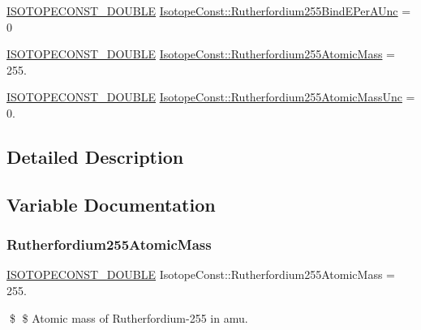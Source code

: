 \begin{DoxyCompactItemize}
\item 
\mbox{\hyperlink{group___isotope_const-_macros_ga8f45a7272ce02c0b4c65c44636ed719a}{I\+S\+O\+T\+O\+P\+E\+C\+O\+N\+S\+T\+\_\+\+D\+O\+U\+B\+LE}} \mbox{\hyperlink{group___isotope_const-_rutherfordium-_rf255_ga0dbb389acb0612f0ec6556b00e3f41ba}{Isotope\+Const\+::\+Rutherfordium255\+Bind\+E\+Per\+A\+Unc}} = 0
\item 
\mbox{\hyperlink{group___isotope_const-_macros_ga8f45a7272ce02c0b4c65c44636ed719a}{I\+S\+O\+T\+O\+P\+E\+C\+O\+N\+S\+T\+\_\+\+D\+O\+U\+B\+LE}} \mbox{\hyperlink{group___isotope_const-_rutherfordium-_rf255_ga402c320ed18f5c81a62d2c03af5edc82}{Isotope\+Const\+::\+Rutherfordium255\+Atomic\+Mass}} = 255.
\item 
\mbox{\hyperlink{group___isotope_const-_macros_ga8f45a7272ce02c0b4c65c44636ed719a}{I\+S\+O\+T\+O\+P\+E\+C\+O\+N\+S\+T\+\_\+\+D\+O\+U\+B\+LE}} \mbox{\hyperlink{group___isotope_const-_rutherfordium-_rf255_ga186204b6cec0d246875af6b3f2b8af80}{Isotope\+Const\+::\+Rutherfordium255\+Atomic\+Mass\+Unc}} = 0.
\end{DoxyCompactItemize}


\subsection{Detailed Description}


\subsection{Variable Documentation}
\mbox{\label{group___isotope_const-_rutherfordium-_rf255_ga402c320ed18f5c81a62d2c03af5edc82}} 
\subsubsection{\texorpdfstring{Rutherfordium255\+Atomic\+Mass}{Rutherfordium255AtomicMass}}
{\footnotesize\ttfamily \mbox{\hyperlink{group___isotope_const-_macros_ga8f45a7272ce02c0b4c65c44636ed719a}{I\+S\+O\+T\+O\+P\+E\+C\+O\+N\+S\+T\+\_\+\+D\+O\+U\+B\+LE}} Isotope\+Const\+::\+Rutherfordium255\+Atomic\+Mass = 255.}

\$ \$ Atomic mass of Rutherfordium-\/255 in amu. \mbox{\label{group___isotope_const-_rutherfordium-_rf255_ga186204b6cec0d246875af6b3f2b8af80}} 

